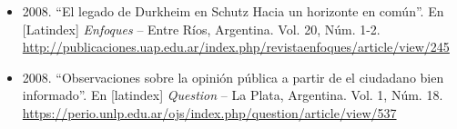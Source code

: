 \begin{itemize}
  \item 2008. ``El legado de Durkheim en Schutz Hacia un horizonte en común''. En [Latindex] \textit{Enfoques} – Entre Ríos, Argentina. Vol. 20, Núm. 1-2.\\
      \url{http://publicaciones.uap.edu.ar/index.php/revistaenfoques/article/view/245}
  
  \item 2008. ``Observaciones sobre la opinión pública a partir de el ciudadano bien informado''. En [latindex] \textit{Question} – La Plata, Argentina. Vol. 1, Núm. 18. \\
      \url{https://perio.unlp.edu.ar/ojs/index.php/question/article/view/537}
\end{itemize}  
  
\vspace{0.2in} %
